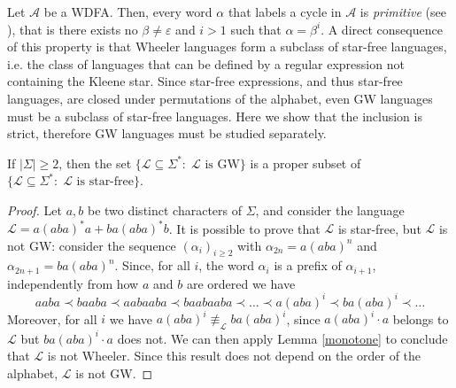 \documentclass[runningheads]{llncs}
\begin{document}
Let $\mathcal A$ be a WDFA. Then, every word $\alpha$ that labels a cycle in $\mathcal A$ is \emph{primitive} (see \cite{ADPP2}), that is there exists no $\beta \ne \varepsilon$ and $i>1$ such that $\alpha = \beta^i$. A direct consequence of this property is that Wheeler languages form a subclass of star-free languages, i.e. the class of languages that can be defined by a regular expression not containing the Kleene star. Since star-free expressions, and thus star-free languages, are closed under permutations of the alphabet, even GW languages must be a subclass of star-free languages. Here we show that the inclusion is strict, therefore GW languages must be studied  separately.

\begin{proposition}
If $|\Sigma| \ge 2$, then the set $\{ \mathcal L \subseteq \Sigma^*: \; \mathcal L \text{ is GW} \}$ is a proper subset of $\{ \mathcal L \subseteq \Sigma^*: \; \mathcal L \text{ is star-free} \}$.
\end{proposition}
\begin{proof}
Let $a,b$ be two distinct characters of $\Sigma$, and consider the language $\mathcal L=a(aba)^*a+ba(aba)^*b$. It is possible to prove that $\mathcal L$ is star-free, but $\mathcal L$ is not GW: consider the sequence $(\alpha_i)_{i\ge 2}$ with $\alpha_{2n}=a(aba)^n$ and $\alpha_{2n+1}=ba(aba)^n$. Since, for all $i$, the word $\alpha_i$ is a prefix of $\alpha_{i+1}$, independently from how $a$ and $b$ are ordered we have 
\[
aaba \prec baaba \prec aabaaba \prec baabaaba \prec \dots \prec a(aba)^i \prec ba(aba)^i \prec \dots
\]
Moreover, for all $i$ we have $a(aba)^i \not\equiv_\mathcal L ba(aba)^i$, since $a(aba)^i \cdot a$ belongs to $\mathcal L$ but $ba(aba)^i \cdot a$ does not. We can then apply Lemma \ref{monotone} to conclude that $\mathcal L$ is not Wheeler. Since this result does not depend on the order of the alphabet, $\mathcal L$ is not GW.
\end{proof}
\end{document}
